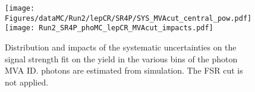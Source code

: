 \begin{figure}
  \centering
  \texttt{[image: Figures/dataMC/Run2/lepCR/SR4P/SYS\_MVAcut\_central\_pow.pdf]}
  \hfill
  \texttt{[image: Run2\_SR4P\_phoMC\_lepCR\_MVAcut\_impacts.pdf]}
  \caption{Distribution and impacts of the systematic uncertainties on the signal strength fit
    on the yield in the various bins of the photon MVA ID.
    \Nonprompt photons are estimated from simulation.
    The FSR cut is not applied.
  }
  \label{fig:inclusive_kin_phoMC_MVAcut}
\end{figure}
